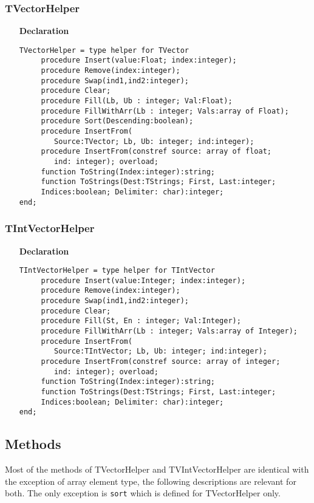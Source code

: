 \documentclass[12pt,a4paper,oneside]{report}
\newcommand{\declarationitem}[1]{\textbf{#1}}
\newcommand{\code}[1]{\texttt{#1}}
\begin{document}
\subsubsection{TVectorHelper}
\begin{itemize}
\item[\declarationitem{Declaration}\hfill]
	\begin{verbatim}
TVectorHelper = type helper for TVector
     procedure Insert(value:Float; index:integer);
     procedure Remove(index:integer);
     procedure Swap(ind1,ind2:integer);
     procedure Clear;
     procedure Fill(Lb, Ub : integer; Val:Float);
     procedure FillWithArr(Lb : integer; Vals:array of Float);
     procedure Sort(Descending:boolean);
     procedure InsertFrom(
     	Source:TVector; Lb, Ub: integer; ind:integer);
     procedure InsertFrom(constref source: array of float; 
        ind: integer); overload;
     function ToString(Index:integer):string;
     function ToStrings(Dest:TStrings; First, Last:integer;
     Indices:boolean; Delimiter: char):integer;
end;
	\end{verbatim}
\end{itemize}
\subsubsection{TIntVectorHelper}
\begin{itemize}
	\item[\declarationitem{Declaration}\hfill]
	\begin{verbatim}
TIntVectorHelper = type helper for TIntVector
     procedure Insert(value:Integer; index:integer);
     procedure Remove(index:integer);
     procedure Swap(ind1,ind2:integer);
     procedure Clear;
     procedure Fill(St, En : integer; Val:Integer);
     procedure FillWithArr(Lb : integer; Vals:array of Integer);
     procedure InsertFrom(
     	Source:TIntVector; Lb, Ub: integer; ind:integer);
     procedure InsertFrom(constref source: array of integer; 
        ind: integer); overload;
     function ToString(Index:integer):string;
     function ToStrings(Dest:TStrings; First, Last:integer;
     Indices:boolean; Delimiter: char):integer;
end;
	\end{verbatim}
\end{itemize}
\subsection{Methods}
Most of the methods of TVectorHelper and TVIntVectorHelper are identical with the exception of array element type, the following descriptions are relevant for both. The only exception is \code{sort} which is defined for TVectorHelper only.
\end{document}
